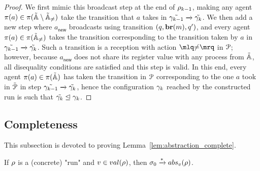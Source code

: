 \begin{proof}
	We first mimic this broadcast step at the end of $\rho_{k-1}$, making any agent $\pi(a) \in \pi(\tilde{\mathbb{A}} \setminus \tilde{\mathbb{A}}_{{\ne}})$ take the transition that $a$ takes in $\tilde{\gamma_{k-1}} \xrightarrow{} \tilde{\gamma_k}$. We then add a new step where $a_{\mathsf{new}}$ broadcasts using transition $(q, \textbf{br}(m), q')$, and every agent $\pi(a) \in \pi(\tilde{\mathbb{A}}_{{\ne}})$ takes the transition corresponding to the transition taken by $a$ in $\tilde{\gamma_{k-1}} \xrightarrow{} \tilde{\gamma_k}$. Such a transition is a reception with action $\quotemarks{\diseqtestact}$ in $\mathcal{P}$; however, because $a_{\mathsf{new}}$ does not share its register value with any process from $\tilde{\mathbb{A}}$, all disequality conditions are satisfied and this step is valid. In this end, every agent $\pi(a) \in \pi(\tilde{\mathbb{A}})$ has taken the transition in $\mathcal{P}$ corresponding to the one $a$ took in $\tilde{\mathcal{P}}$ in step $\tilde{\gamma_{k-1}} \xrightarrow{} \tilde{\gamma_k}$, hence the configuration $\gamma_k$ reached by the constructed run is such that $\tilde{\gamma_k} \trianglelefteq \gamma_k$. 
\end{proof}

\subsection{Completeness}
\label{one-completeness}

This subsection is devoted to proving Lemma~\ref{lem:abstraction_complete}.

\begin{lemma}
	\label{lem:abstraction_complete}
	If $\rho$ is a (concrete) "run" and $\aval \in \valsof{\run}$, then $\aconfiginit \step{*} \absproj{\aval}{\run}$. 
\end{lemma}



